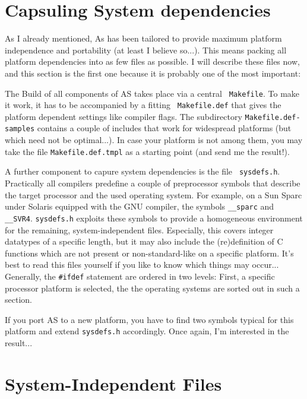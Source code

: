 \documentclass[12pt,twoside]{report}
\begin{document}

\section{Capsuling System dependencies}

As I already mentioned, As has been tailored to provide maximum platform
independence and portability (at least I believe so...).  This means
packing all platform dependencies into as few files as possible.  I will
describe these files now, and this section is the first one because it is
probably one of the most important:

The Build of all components of AS takes place via a central {\tt
Makefile}.  To make it work, it has to be accompanied by a fitting {\tt
Makefile.def} that gives the platform dependent settings like compiler
flags.  The subdirectory {\tt Makefile.def-samples} contains a couple of
includes that work for widespread platforms (but which need not be
optimal...).  In case your platform is not among them, you may take the
file {\tt Makefile.def.tmpl} as a starting point (and send me the
result!).

A further component to capure system dependencies is the file {\tt
sysdefs.h}.  Practically all compilers predefine a couple of preprocessor
symbols that describe the target processor and the used operating system.
For example, on a Sun Sparc under Solaris equipped with the GNU compiler,
the symbols \verb!__sparc! and \verb!__SVR4!.  {\tt sysdefs.h} exploits
these symbols to provide a homogeneous environment for the remaining,
system-independent files.  Especially, this covers integer datatypes of a
specific length, but it may also include the (re)definition of C functions
which are not present or non-standard-like on a specific platform.  It's
best to read this files yourself if you like to know which things may
occur...  Generally, the \verb!#ifdef! statement are ordered in two
levels: First, a specific processor platform is selected, the the
operating systems are sorted out in such a section.

If you port AS to a new platform, you have to find two symbols typical for
this platform and extend {\tt sysdefs.h} accordingly.  Once again, I'm
interested in the result...


\section{System-Independent Files}
\end{document}
